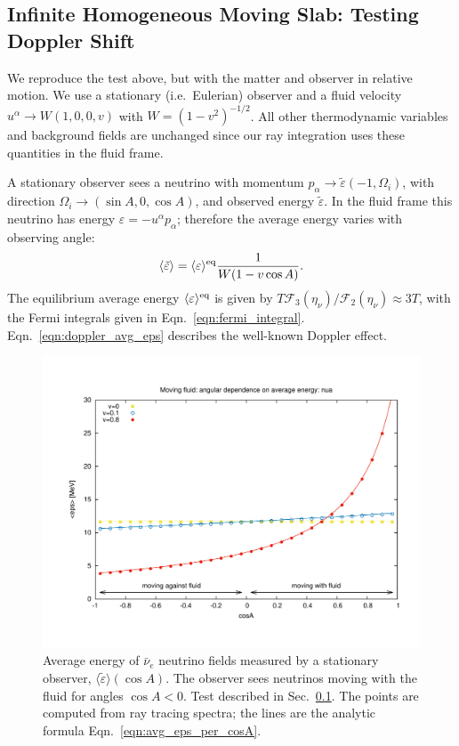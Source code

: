 \documentclass[aps,floatfix,prd,superscriptaddress,twocolumn]{revtex4-1}
\begin{document}
\subsection{Infinite Homogeneous Moving Slab:
  Testing Doppler Shift}
\label{ssec:test_doppler}
We reproduce the test above, but with the matter and observer in relative
motion.
We use a stationary (i.e.\ Eulerian) observer
and a fluid velocity $u^\alpha \rightarrow W(1,0,0,v)$ with $W=(1-v^2)^{-1/2}$.
All other thermodynamic variables and background fields are unchanged
since our ray integration uses these quantities in the fluid frame.

A stationary observer sees a neutrino with momentum
$p_\alpha \rightarrow \tilde{\varepsilon}(-1,\Omega_i)$,
with direction $\Omega_i \rightarrow (\sin A, 0, \cos A)$,
and observed energy $\tilde{\varepsilon}$.
In the fluid frame this neutrino has energy $\varepsilon=-u^\alpha p_\alpha$;
therefore the average energy varies with observing angle:
\begin{equation}
  \label{eqn:doppler_avg_eps}
  \langle \tilde{\varepsilon} \rangle =
  \langle \varepsilon \rangle^{\rm eq} \frac{1}{W(1-v \cos A)}.
\end{equation}
The equilibrium average energy $\langle \varepsilon \rangle^{\rm eq}$
is given by $T \mathscr{F}_3(\eta_\nu)/\mathscr{F}_2(\eta_\nu)\approx 3T$,
with the Fermi integrals given in Eqn.~\ref{eqn:fermi_integral}.
Eqn.~\ref{eqn:doppler_avg_eps} describes the well-known Doppler effect.

\begin{figure}
  \includegraphics[width=\columnwidth]{fig-moving_fluid_avg_eps}
  \caption{Average energy of $\bar{\nu}_e$ neutrino fields
    measured by a stationary observer,
    $\langle\tilde{\varepsilon}\rangle(\cos A)$.
    The observer sees neutrinos moving with the fluid for angles $\cos A<0$.
    Test described in Sec.~\ref{ssec:test_doppler}.
    The points are computed from ray tracing spectra; the lines are the
    analytic formula Eqn.~\ref{eqn:avg_eps_per_cosA}.
  }
  \label{fig:avg_eps_doppler}
\end{figure}
\end{document}

